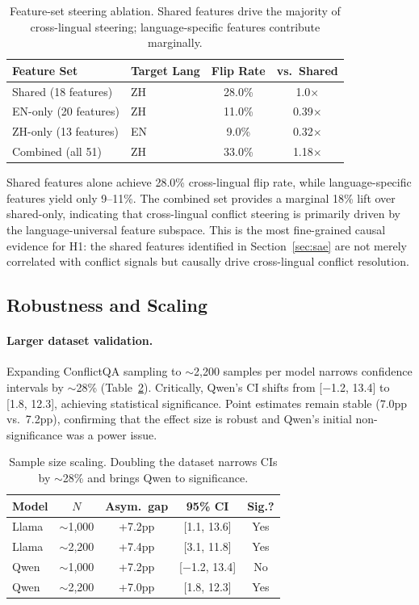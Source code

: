 \documentclass{article}
\begin{document}
\begin{table}[t]
\centering
\caption{Feature-set steering ablation. Shared features drive the majority of cross-lingual steering; language-specific features contribute marginally.}
\label{tab:feature_ablation}
\small
\begin{tabular}{llcc}
\toprule
Feature Set & Target Lang & Flip Rate & vs.\ Shared \\
\midrule
Shared (18 features) & ZH & 28.0\% & 1.0$\times$ \\
EN-only (20 features) & ZH & 11.0\% & 0.39$\times$ \\
ZH-only (13 features) & EN & 9.0\% & 0.32$\times$ \\
Combined (all 51) & ZH & 33.0\% & 1.18$\times$ \\
\bottomrule
\end{tabular}
\end{table}

Shared features alone achieve 28.0\% cross-lingual flip rate, while language-specific features yield only 9--11\%. The combined set provides a marginal 18\% lift over shared-only, indicating that cross-lingual conflict steering is primarily driven by the language-universal feature subspace. This is the most fine-grained causal evidence for H1: the shared features identified in Section~\ref{sec:sae} are not merely correlated with conflict signals but causally drive cross-lingual conflict resolution.

\subsection{Robustness and Scaling}
\label{sec:scaling}

\paragraph{Larger dataset validation.}
Expanding ConflictQA sampling to $\sim$2,200 samples per model narrows confidence intervals by $\sim$28\% (Table~\ref{tab:scaling}). Critically, Qwen's CI shifts from [$-$1.2, 13.4] to [1.8, 12.3], achieving statistical significance. Point estimates remain stable (7.0pp vs.\ 7.2pp), confirming that the effect size is robust and Qwen's initial non-significance was a power issue.

\begin{table}[t]
\centering
\caption{Sample size scaling. Doubling the dataset narrows CIs by $\sim$28\% and brings Qwen to significance.}
\label{tab:scaling}
\small
\begin{tabular}{lcccc}
\toprule
Model & $N$ & Asym.\ gap & 95\% CI & Sig.? \\
\midrule
Llama & $\sim$1,000 & +7.2pp & [1.1, 13.6] & Yes \\
Llama & $\sim$2,200 & +7.4pp & [3.1, 11.8] & Yes \\
Qwen & $\sim$1,000 & +7.2pp & [$-$1.2, 13.4] & No \\
Qwen & $\sim$2,200 & +7.0pp & [1.8, 12.3] & Yes \\
\bottomrule
\end{tabular}
\end{table}
\end{document}
